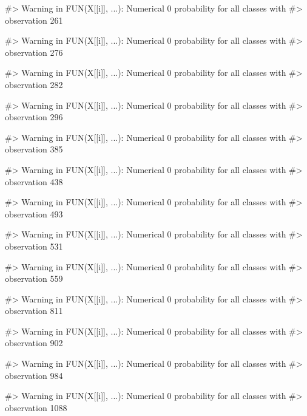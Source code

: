 \begin{Schunk}
\begin{Soutput}
#> Warning in FUN(X[[i]], ...): Numerical 0 probability for all classes with
#> observation 261
\end{Soutput}
\begin{Soutput}
#> Warning in FUN(X[[i]], ...): Numerical 0 probability for all classes with
#> observation 276
\end{Soutput}
\begin{Soutput}
#> Warning in FUN(X[[i]], ...): Numerical 0 probability for all classes with
#> observation 282
\end{Soutput}
\begin{Soutput}
#> Warning in FUN(X[[i]], ...): Numerical 0 probability for all classes with
#> observation 296
\end{Soutput}
\begin{Soutput}
#> Warning in FUN(X[[i]], ...): Numerical 0 probability for all classes with
#> observation 385
\end{Soutput}
\begin{Soutput}
#> Warning in FUN(X[[i]], ...): Numerical 0 probability for all classes with
#> observation 438
\end{Soutput}
\begin{Soutput}
#> Warning in FUN(X[[i]], ...): Numerical 0 probability for all classes with
#> observation 493
\end{Soutput}
\begin{Soutput}
#> Warning in FUN(X[[i]], ...): Numerical 0 probability for all classes with
#> observation 531
\end{Soutput}
\begin{Soutput}
#> Warning in FUN(X[[i]], ...): Numerical 0 probability for all classes with
#> observation 559
\end{Soutput}
\begin{Soutput}
#> Warning in FUN(X[[i]], ...): Numerical 0 probability for all classes with
#> observation 811
\end{Soutput}
\begin{Soutput}
#> Warning in FUN(X[[i]], ...): Numerical 0 probability for all classes with
#> observation 902
\end{Soutput}
\begin{Soutput}
#> Warning in FUN(X[[i]], ...): Numerical 0 probability for all classes with
#> observation 984
\end{Soutput}
\begin{Soutput}
#> Warning in FUN(X[[i]], ...): Numerical 0 probability for all classes with
#> observation 1088
\end{Soutput}

\end{Schunk}
